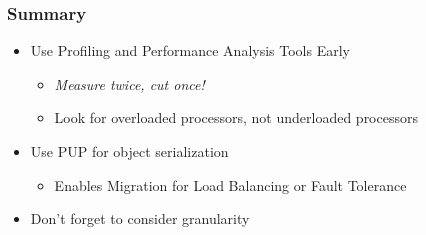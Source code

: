 \begin{frame}[fragile]
\frametitle{Summary}
\begin{itemize}
 \item Use Profiling and Performance Analysis Tools Early
 \begin{itemize}
  \item \emph{Measure twice, cut once!}
  \item Look for overloaded processors, not underloaded processors
 \end{itemize}
 \item Use PUP for object serialization 
 \begin{itemize}
  \item Enables Migration for Load Balancing or Fault Tolerance
 \end{itemize}
 \item Don't forget to consider granularity
\end{itemize}
\end{frame}
 
